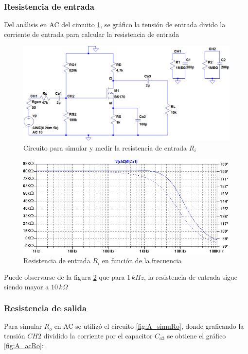 \documentclass[10pt,spanish,a4paper,notitlepage]{article}
\begin{document}
\subsubsection{Resistencia de entrada}
Del análisis en AC del circuito \ref{fig:A_simuRi}, se gráfico la tensión de entrada divido la corriente de entrada para calcular la resistencia de entrada

\begin{figure}[H]
\centering
\includegraphics[scale=0.6]{circuitos/A_simuRi.png}
\caption{Circuito para simular y medir la resistencia de entrada $R_i$}
\label{fig:A_simuRi}
\end{figure}


\begin{figure}[H]
\centering
\includegraphics[scale=0.7]{simulaciones/A_acRi.png}  %
\caption{Resistencia de entrada $R_i$ en función de la frecuencia}
\label{fig:A_acRi}
\end{figure}

Puede observarse de la figura \ref{fig:A_acRi} que para $1\,\unit{kHz}$, la resistencia de entrada sigue siendo mayor a $10\,\unit{k\Omega}$

\subsubsection{Resistencia de salida}
Para simular $R_o$ en AC se utilizó el circuito \ref{fig:A_simuRo}, donde graficando la tensión $CH2$ dividido la corriente por el capacitor $C_{a3}$ se obtiene el gráfico \ref{fig:A_acRo}:
\end{document}
